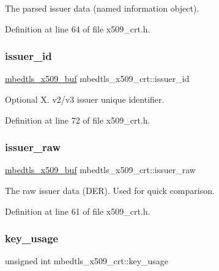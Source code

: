 The parsed issuer data (named information object). 

Definition at line 64 of file x509\+\_\+crt.\+h.

\mbox{\label{structmbedtls__x509__crt_a6bb2a7142b718fa43b948770ccc98dcd}} 
\subsubsection{\texorpdfstring{issuer\+\_\+id}{issuer\_id}}
{\footnotesize\ttfamily \mbox{\hyperlink{group__x509__module_ga4d02c9e8e4e2934555e0d132cd2976dc}{mbedtls\+\_\+x509\+\_\+buf}} mbedtls\+\_\+x509\+\_\+crt\+::issuer\+\_\+id}

Optional X. v2/v3 issuer unique identifier. 

Definition at line 72 of file x509\+\_\+crt.\+h.

\mbox{\label{structmbedtls__x509__crt_afb876a6a7b85e160620c4549324d9e8d}} 
\subsubsection{\texorpdfstring{issuer\+\_\+raw}{issuer\_raw}}
{\footnotesize\ttfamily \mbox{\hyperlink{group__x509__module_ga4d02c9e8e4e2934555e0d132cd2976dc}{mbedtls\+\_\+x509\+\_\+buf}} mbedtls\+\_\+x509\+\_\+crt\+::issuer\+\_\+raw}

The raw issuer data (D\+ER). Used for quick comparison. 

Definition at line 61 of file x509\+\_\+crt.\+h.

\mbox{\label{structmbedtls__x509__crt_a3b7650600aa6e637b8ab534a938aee94}} 
\subsubsection{\texorpdfstring{key\+\_\+usage}{key\_usage}}
{\footnotesize\ttfamily unsigned int mbedtls\+\_\+x509\+\_\+crt\+::key\+\_\+usage}

